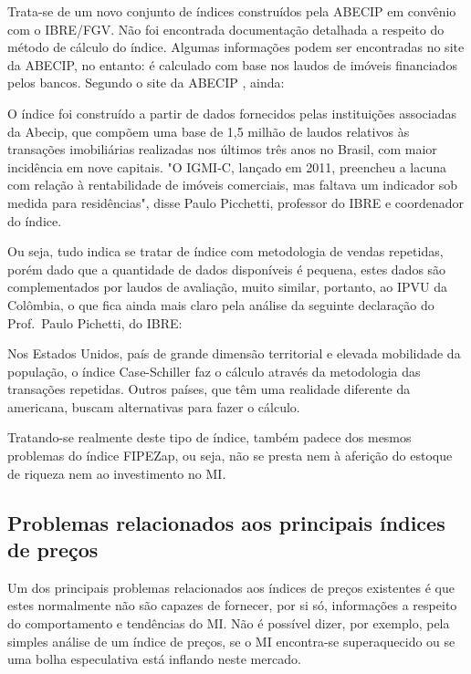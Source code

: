 \documentclass[
	12pt,				%
	oneside,			%
	a4paper,			%
	chapter=TITLE,		%
	section=TITLE,		%
	english,			%
	brazil				%
	]{abntex2}
\begin{document}
\begin{refsection}
Trata-se de um novo conjunto de índices construídos pela \gls{ABECIP} em
convênio com o \gls{IBRE}/\gls{FGV}. Não foi encontrada documentação detalhada a
respeito do método de cálculo do índice. Algumas informações podem ser encontradas
no site da \gls{ABECIP}, no entanto: é calculado com base nos laudos de imóveis
financiados pelos bancos. Segundo o site da \gls{ABECIP} \autocite{abecip}, ainda:
\begin{citacao}
O índice foi construído a partir de dados fornecidos pelas instituições
associadas da Abecip, que compõem  uma base de 1,5 milhão de laudos relativos às
transações imobiliárias realizadas nos últimos três anos no Brasil, com maior
incidência em nove capitais. "O IGMI-C, lançado em 2011, preencheu a lacuna com
relação à rentabilidade de imóveis comerciais, mas faltava um indicador sob
medida para residências", disse Paulo Picchetti, professor do IBRE e coordenador
do índice.
\end{citacao}
Ou seja, tudo indica se tratar de índice com metodologia de vendas repetidas,
porém dado que a quantidade de dados disponíveis é pequena, estes dados são
complementados por laudos de avaliação, muito similar, portanto, ao IPVU da
Colômbia, o que fica ainda mais claro pela análise da seguinte declaração do
Prof.~Paulo Pichetti, do \gls{IBRE}:
\begin{citacao}
Nos Estados Unidos, país de grande dimensão territorial e elevada mobilidade
da população, o índice Case-Schiller faz o cálculo através da metodologia das
transações repetidas. Outros países, que têm uma realidade diferente da
americana, buscam alternativas para fazer o cálculo.
\end{citacao}
Tratando-se realmente deste tipo de índice, também padece dos mesmos problemas
do índice FIPEZap, ou seja, não se presta nem à aferição do estoque de riqueza
nem ao investimento no \gls{MI}.

\hypertarget{problemas-relacionados-aos-principais-uxedndices-de-preuxe7os}{%
\subsection{Problemas relacionados aos principais índices de preços}\label{problemas-relacionados-aos-principais-uxedndices-de-preuxe7os}}

Um dos principais problemas relacionados aos índices de preços existentes é que
estes normalmente não são capazes de fornecer, por si só, informações a respeito
do comportamento e tendências do \gls{MI}. Não é possível dizer, por exemplo,
pela simples análise de um índice de preços, se o \gls{MI} encontra-se
superaquecido ou se uma bolha especulativa está inflando neste mercado.


\end{refsection}
\end{document}

